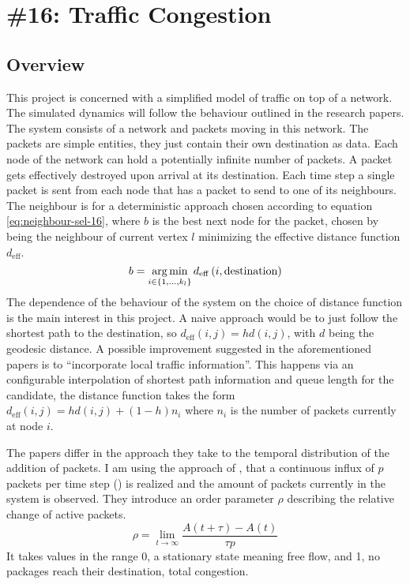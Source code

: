 \chapter[Task 16]{\#16: Traffic Congestion}


\section{Overview}
This project is concerned with a simplified model of traffic on top of a network.
The simulated dynamics will follow the behaviour outlined in the research papers\cite{Echenique2004}\cite{Echenique2005}.
The system consists of a network and packets moving in this network.
The packets are simple entities, they just contain their own destination as data.
Each node of the network can hold a potentially infinite number of packets.
A packet gets effectively destroyed upon arrival at its destination.
Each time step a single packet is sent from each node that has a packet to send to one of its neighbours.
The neighbour is for a deterministic approach chosen according to equation \ref{eq:neighbour-sel-16}, where $b$ is the best next node for the packet, chosen by being the neighbour of current vertex $l$ minimizing the effective distance function $d_\mathrm{eff}$.
\begin{equation}
	b = \operatorname*{arg\,min}_{i \in \{1, ..., k_l\}} d_\mathrm{eff}\left(i, \mathrm{destination}\right) \label{eq:neighbour-sel-16}
\end{equation}
The dependence of the behaviour of the system on the choice of distance function is the main interest in this project.
A naive approach would be to just follow the shortest path to the destination, so $d_\mathrm{eff}(i, j) = hd(i, j)$, with $d$ being the geodesic distance.
A possible improvement suggested in the aforementioned papers is to ``incorporate local traffic information''\cite[Abstract]{Echenique2005}.
This happens via an configurable interpolation of shortest path information and queue length for the candidate, the distance function takes the form $d_\mathrm{eff}(i, j) = hd(i, j) + (1-h) n_i$ where $n_i$ is the number of packets currently at node $i$.

The papers differ in the approach they take to the temporal distribution of the addition of packets.
I am using the approach of \cite{Echenique2005}, that a continuous influx of $p$ packets per time step (\si{\pps}) is realized and the amount of packets currently in the system is observed.
They introduce an order parameter $\rho$ describing the relative change of active packets.
\begin{equation}
	\rho = \lim_{t\rightarrow\infty} \frac{A(t+\tau) - A(t)}{\tau p}
\end{equation}
It takes values in the range 0, a stationary state meaning free flow, and 1, no packages reach their destination, total congestion.

